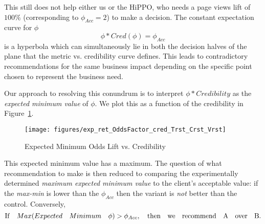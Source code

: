 \documentclass[letterpaper,12pt]{article}
\newcommand{\bdm}{\begin{displaymath}} %
\newcommand{\edm}{\end{displaymath}} %
\begin{document}
This still does not help either us or the HiPPO, who needs a page
views lift of \(100\%\) (corresponding to \(\phi_{Acc}=2\)) to make a
decision. The constant expectation curve for \(\phi\)
\bdm
\phi* Cred(\phi) = \phi_{Acc}
\edm
is a hyperbola which can simultaneously lie in both the decision
halves of the plane that the metric vs. credibility curve
defines. This leads to contradictory recommendations for the same
business impact depending on the specific point chosen to represent
the business need.

Our approach to resolving this conundrum is to interpret
\(\phi*Credibility \) as the {\em expected minimum value} of
\(\phi\). We plot this as a function of the credibility in
Figure~\ref{fig:exp_odds_vs_cred}.
\begin{figure}[ht!]
\centering
\texttt{[image: figures/exp\_ret\_OddsFactor\_cred\_Trst\_Crst\_Vrst]}
\caption{Expected Minimum Odds Lift vs. Credibility \label{fig:exp_odds_vs_cred}}
\end{figure}
This expected minimum value has a maximum. The question of what recommendation to make is then
reduced to comparing the experimentally determined {\em maximum
  expected minimum value} to the client's acceptable value: if the
{\em max-min} is lower than the \(\phi_{Acc}\) then the variant is
{\em not} better than the control. Conversely,
\bdm
    {\rm If}\quad Max(Expected\quad Minimum\quad\phi) > \phi_{Acc},\quad {\rm then\quad we\quad recommend\quad A\quad over\quad B.}
\edm
\end{document}
